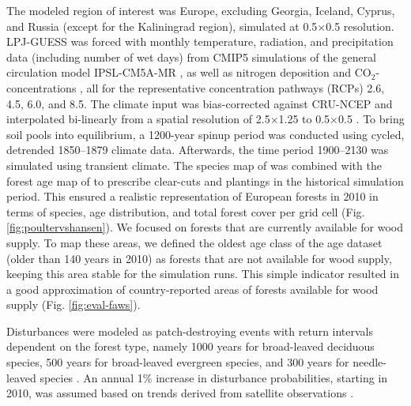 \documentclass[]{article}
\newcommand{\coo}{\ensuremath{\mathrm{CO_2}}}
\begin{document}
The modeled region of interest was Europe, excluding Georgia, Iceland, Cyprus, and Russia (except for the Kaliningrad region), simulated at 0.5\textdegree{}$\times$0.5\textdegree{} resolution.
LPJ-GUESS was forced with monthly temperature, radiation, and precipitation data (including number of wet days) from CMIP5 simulations \parencite{Taylor2012} of the general circulation model IPSL-CM5A-MR \parencite{Dufresne2013}, as well as nitrogen deposition \parencite{Lamarque2011} and \coo{}-concentrations \parencite{Meinshausen2011}, all for the representative concentration pathways (RCPs) 2.6, 4.5, 6.0, and 8.5. The climate input was bias-corrected against CRU-NCEP and interpolated bi-linearly from a spatial resolution of 2.5\textdegree{}$\times$1.25\textdegree{} to 0.5\textdegree{}$\times$0.5\textdegree{} \parencite{Ahlstrom2012}.
To bring soil pools into equilibrium, a 1200-year spinup period was conducted using cycled, detrended 1850--1879 climate data. Afterwards, the time period 1900--2130 was simulated using transient climate.
The species map of \textcite{Brus2012} was combined with the forest age map of \textcite{poulter2018tgfa} to prescribe clear-cuts and plantings in the historical simulation period. This ensured a realistic representation of European forests in 2010 in terms of species, age distribution, and total forest cover per grid cell (Fig. \ref{fig:poultervshansen}).
We focused on forests that are currently available for wood supply. To map these areas, we defined the oldest age class of the age dataset (older than 140 years in 2010) as forests that are not available for wood supply, keeping this area stable for the simulation runs. This simple indicator resulted in a good approximation of country-reported areas of forests available for wood supply (Fig. \ref{fig:eval-faws}).

Disturbances were modeled as patch-destroying events with return intervals dependent on the forest type, namely 1000 years for broad-leaved deciduous species, 500 years for broad-leaved evergreen species, and 300 years for needle-leaved species \parencite{Pugh2019a}.
An annual 1\% increase in disturbance probabilities, starting in 2010, was assumed based on trends derived from satellite observations \parencite{Senf2021a}.
\end{document}
